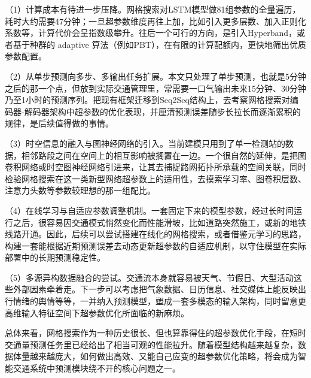 \documentclass[12pt,a4paper,oneside]{ctexbook}
\begin{document}
	（1）计算成本有待进一步压降。网格搜索对LSTM模型做81组参数的全量遍历，耗时大约需要47分钟；一旦超参数维度再往上加，比如引入更多层数、加入正则化系数等，计算代价会呈指数级攀升。往后一个可行的方向，是引入Hyperband，或者基于种群的 adaptive 算法（例如PBT），在有限的计算配额内，更快地筛出优质参数配置。
	
	（2）从单步预测向多步、多输出任务扩展。本文只处理了单步预测，也就是5分钟之后的那一个点，但放到实际交通管理里，常需要一口气输出未来15分钟、30分钟乃至1小时的预测序列。把现有框架迁移到Seq2Seq结构上，去考察网格搜索对编码器-解码器架构中超参数的优化表现，并厘清预测误差随步长拉长而逐渐累积的规律，是后续值得做的事情。
	
	（3）时空信息的融入与图神经网络的引入。当前建模只用到了单一检测站的数据，相邻路段之间在空间上的相互影响被搁置在一边。一个很自然的延伸，是把图卷积网络或时空图神经网络引进来，让其去捕捉路网拓扑所承载的空间关联，同时检验网格搜索在这一类新型网络超参数上的适用性，去摸索学习率、图卷积层数、注意力头数等参数较理想的那一组配比。
	
	（4）在线学习与自适应参数调整机制。一套固定下来的模型参数，经过长时间运行之后，很容易因交通模式悄然变化而性能滑坡，比如道路突然施工，或新的地铁线路开通。因此，后续可以尝试搭建在线化的网格搜索，或者借鉴元学习的思路，构建一套能根据近期预测误差去动态更新超参数的自适应机制，以守住模型在实际部署中的长期预测稳定性。
	
	（5）多源异构数据融合的尝试。交通流本身就容易被天气、节假日、大型活动这些外部因素牵着走。下一步可以考虑把气象数据、日历信息、社交媒体上能反映出行情绪的舆情等等，一并纳入预测模型，塑成一套多模态的输入架构，同时留意更高维输入特征空间下超参数优化所面临的新麻烦。
	
	总体来看，网格搜索作为一种历史很长、但也算靠得住的超参数优化手段，在短时交通量预测任务里已经给出了相当可观的性能拉升。随着模型结构越来越复杂，数据体量越来越庞大，如何做出高效、又能自己应变的超参数优化策略，将会成为智能交通系统中预测模块绕不开的核心问题之一。
	
\end{document}
